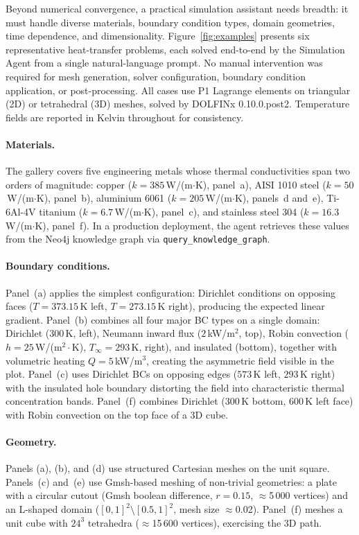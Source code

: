 \documentclass[preprint,review,12pt]{elsarticle}
\begin{document}
Beyond numerical convergence, a practical simulation assistant needs
breadth: it must handle diverse materials, boundary
condition types, domain geometries, time dependence, and dimensionality.
Figure~\ref{fig:examples} presents six representative heat-transfer
problems, each solved end-to-end by the Simulation Agent from a single
natural-language prompt.  No manual intervention was required for mesh
generation, solver configuration, boundary condition application, or
post-processing.  All cases use P1 Lagrange elements on triangular
(2D) or tetrahedral (3D) meshes, solved by DOLFINx 0.10.0.post2.
Temperature fields are reported in Kelvin throughout for consistency.

\paragraph{Materials.}
The gallery covers five engineering metals whose thermal
conductivities span two orders of magnitude:
copper ($k=385$\,W/(m$\cdot$K), panel~a),
AISI 1010 steel ($k=50$\,W/(m$\cdot$K), panel~b),
aluminium 6061 ($k=205$\,W/(m$\cdot$K), panels~d and~e),
Ti-6Al-4V titanium ($k=6.7$\,W/(m$\cdot$K), panel~c),
and stainless steel 304 ($k=16.3$\,W/(m$\cdot$K), panel~f).
In a production deployment, the agent retrieves these values from the
Neo4j knowledge graph via \texttt{query\_knowledge\_graph}.

\paragraph{Boundary conditions.}
Panel~(a) applies the simplest configuration: Dirichlet conditions on
opposing faces ($T=373.15$\,K left, $T=273.15$\,K right), producing
the expected linear gradient.  Panel~(b) combines all four major
BC types on a single domain: Dirichlet ($300$\,K, left), Neumann
inward flux ($2$\,kW/m$^2$, top), Robin convection ($h=25$\,W/(m$^2
\cdot$K), $T_\infty=293$\,K, right), and insulated (bottom), together
with volumetric heating $Q=5$\,kW/m$^3$, creating the asymmetric
field visible in the plot.  Panel~(c) uses Dirichlet BCs on opposing
edges ($573$\,K left, $293$\,K right) with the insulated hole boundary
distorting the field into characteristic thermal concentration bands.
Panel~(f) combines Dirichlet ($300$\,K bottom, $600$\,K left face)
with Robin convection on the top face of a 3D cube.

\paragraph{Geometry.}
Panels (a), (b), and (d) use structured Cartesian meshes on the
unit square.  Panels~(c) and~(e) use Gmsh-based meshing
of non-trivial geometries: a plate with a circular cutout
(Gmsh boolean difference, $r=0.15$, $\approx$5\,000 vertices) and
an L-shaped domain ($[0,1]^2 \setminus [0.5,1]^2$, mesh size
$\approx$0.02).  Panel~(f) meshes a unit cube with $24^3$
tetrahedra ($\approx$15\,600 vertices), exercising the 3D path.
\end{document}
